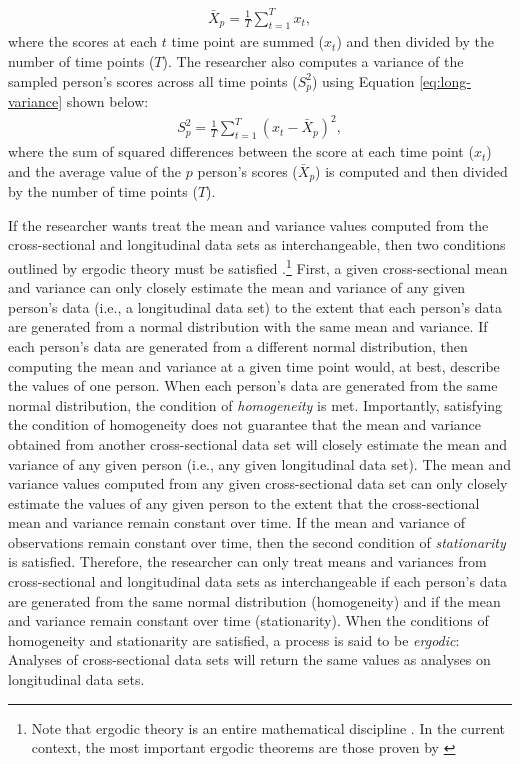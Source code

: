 \documentclass[
12pt, %
twoside,
english]{guelphthesis}
\begin{document}
\begin{align}
\bar{X}_p = \frac{1}{T}\sum^T_{t = 1} x_t,
\label{eq:long-mean}
\end{align}
\noindent where the scores at each \(t\) time point are summed (\(x_t\)) and then divided by the number of time points (\(T\)). The researcher also computes a variance of the sampled person's scores across all time points (\(S^2_p\)) using Equation \ref{eq:long-variance} shown below:
\begin{align}
S^2_p = \frac{1}{T}\sum^T_{t = 1} (x_t - \bar{X}_p)^2,
\label{eq:long-variance}
\end{align}
\noindent where the sum of squared differences between the score at each time point (\(x_t\)) and the average value of the \(p\) person's scores (\(\bar{X}_p\)) is computed and then divided by the number of time points (\(T\)).

If the researcher wants treat the mean and variance values computed from the cross-sectional and longitudinal data sets as interchangeable, then two conditions outlined by ergodic theory must be satisfied \autocite{molenaar2004,molenaar2009}.\footnote{Note that ergodic theory is an entire mathematical discipline \parencite[for an introduction, see][]{petersen1983}. In the current context, the most important ergodic theorems are those proven by \citeauthor{birkhoff1931} } First, a given cross-sectional mean and variance can only closely estimate the mean and variance of any given person's data (i.e., a longitudinal data set) to the extent that each person's data are generated from a normal distribution with the same mean and variance. If each person's data are generated from a different normal distribution, then computing the mean and variance at a given time point would, at best, describe the values of one person. When each person's data are generated from the same normal distribution, the condition of \emph{homogeneity} is met. Importantly, satisfying the condition of homogeneity does not guarantee that the mean and variance obtained from another cross-sectional data set will closely estimate the mean and variance of any given person (i.e., any given longitudinal data set). The mean and variance values computed from any given cross-sectional data set can only closely estimate the values of any given person to the extent that the cross-sectional mean and variance remain constant over time. If the mean and variance of observations remain constant over time, then the second condition of \emph{stationarity} is satisfied. Therefore, the researcher can only treat means and variances from cross-sectional and longitudinal data sets as interchangeable if each person's data are generated from the same normal distribution (homogeneity) and if the mean and variance remain constant over time (stationarity). When the conditions of homogeneity and stationarity are satisfied, a process is said to be \emph{ergodic}: Analyses of cross-sectional data sets will return the same values as analyses on longitudinal data sets.
\end{document}
